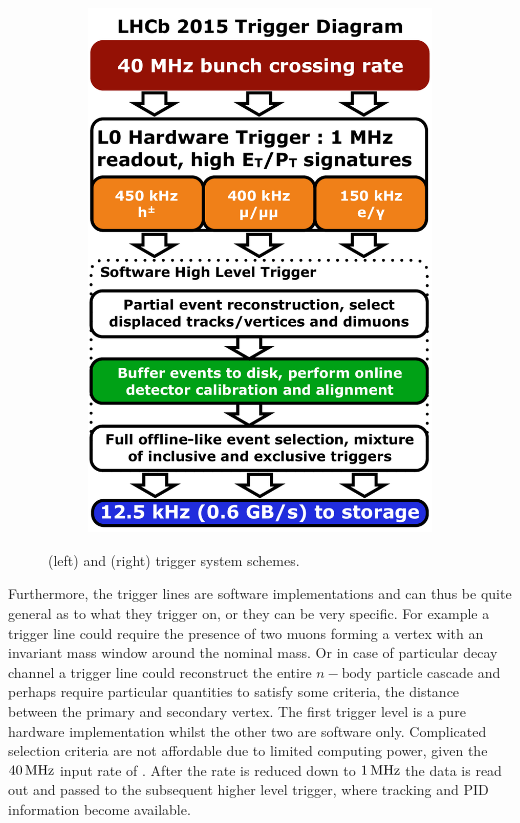 \begin{figure}[t]
\begin{subfigure}{0.5\textwidth}
    \includegraphics[width=\textwidth]{Figures/Chapter2/LHCb_Trigger_RunII_May2015}
    \caption{}
    \label{det_run_two_trigger}
  \end{subfigure}
  \caption{ \runone (left) and \runtwo (right) trigger system schemes.}
  \label{det_trigger_scheams}
\end{figure}


Furthermore, the \hlt trigger lines are software
implementations and can thus be quite general as to what they trigger on, or they can be very specific.
For example a trigger line could require the presence of two muons forming a vertex
with an invariant mass window around the nominal \jpsi mass. Or in case of particular decay channel a
trigger line could reconstruct the entire $n-\text{body}$ particle cascade and perhaps require
particular quantities to satisfy some criteria, \ie the distance between the primary and secondary vertex.
The first trigger level is a pure hardware implementation whilst the other two are software only.
Complicated selection criteria are not affordable due to limited computing power, given the
$40{\rm \,MHz}$ input rate of \lzero. After the rate is reduced down to $1{\rm \,MHz}$ the data is read out and
passed to the subsequent higher level trigger, where tracking and PID information become available.

